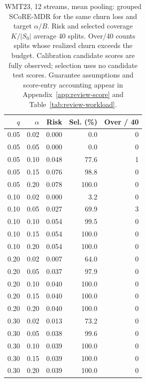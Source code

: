 \begin{table}[t]
\centering\small
\begin{tabular}{rrrrr}
\toprule
$q$ & $\alpha$ & Risk & Sel. (\%) & Over / 40 \\
\midrule
0.05 & 0.02 & 0.000 & 0.0 & 0 \\
0.05 & 0.05 & 0.000 & 0.0 & 0 \\
0.05 & 0.10 & 0.048 & 77.6 & 1 \\
0.05 & 0.15 & 0.076 & 98.8 & 0 \\
0.05 & 0.20 & 0.078 & 100.0 & 0 \\
0.10 & 0.02 & 0.000 & 3.2 & 0 \\
0.10 & 0.05 & 0.027 & 69.9 & 3 \\
0.10 & 0.10 & 0.054 & 99.5 & 0 \\
0.10 & 0.15 & 0.054 & 100.0 & 0 \\
0.10 & 0.20 & 0.054 & 100.0 & 0 \\
0.20 & 0.02 & 0.007 & 64.0 & 0 \\
0.20 & 0.05 & 0.037 & 97.9 & 0 \\
0.20 & 0.10 & 0.040 & 100.0 & 0 \\
0.20 & 0.15 & 0.040 & 100.0 & 0 \\
0.20 & 0.20 & 0.040 & 100.0 & 0 \\
0.30 & 0.02 & 0.013 & 73.2 & 0 \\
0.30 & 0.05 & 0.038 & 99.6 & 0 \\
0.30 & 0.10 & 0.039 & 100.0 & 0 \\
0.30 & 0.15 & 0.039 & 100.0 & 0 \\
0.30 & 0.20 & 0.039 & 100.0 & 0 \\
\bottomrule
\end{tabular}
\caption{WMT23, 12 streams, mean pooling: grouped SCoRE-MDR for the same churn loss and target $\alpha/B$. Risk and selected coverage $K/|S_0|$ average 40 splits. Over/40 counts splits whose realized churn exceeds the budget. Calibration candidate scores are fully observed; selection uses no candidate test scores. Guarantee assumptions and score-entry accounting appear in Appendix~\ref{app:review-score} and Table~\ref{tab:review-workload}.}
\label{tab:review-score-2-mean}
\end{table}
